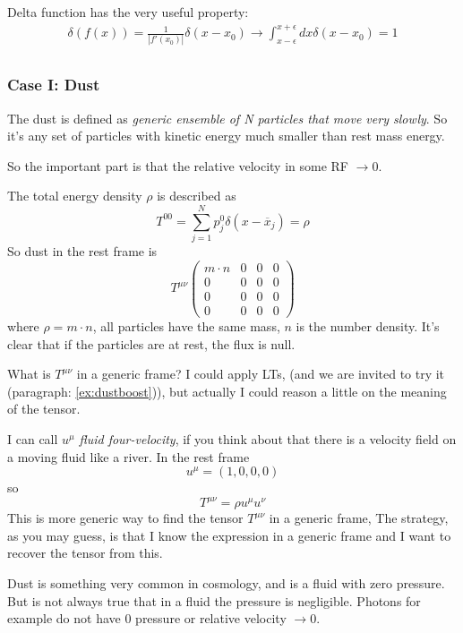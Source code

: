 Delta function has the very useful property:
\begin{gather*}
\delta\left( f\left( x \right) \right) = \frac{1}{\left| f'\left( x_{0} \right)\right|} \delta\left( x-x_{0} \right) \to \int_{x-\epsilon }^{x+\epsilon }{dx \delta \left( x-x_{0} \right)}=1\\
\end{gather*}

\subsubsection{Case I: Dust}
The dust is defined as \emph{generic ensemble of N particles that move very slowly}. So it's any set of particles with kinetic energy much smaller than rest mass energy.

So the important part is that the relative velocity in some RF $\to 0$.

The total energy density $\rho $ is described as 
\[
	T^{00} = \sum_{j = 1}^{N}{p^{0}_{j} \delta\left( x- \overline{x}_{j} \right)} = \rho 
\]
So dust in the rest frame is 
\begin{equation}
T^{\mu \nu }\begin{pmatrix}
m\cdot n & 0 & 0 & 0 \\
0 & 0 & 0 & 0 \\
0 & 0 & 0 & 0 \\
0 & 0 & 0 & 0
\end{pmatrix} 
\end{equation}
where $\rho = m\cdot n$, all particles have the same mass, $n$ is the number density. It's clear that if the particles are at rest, the flux is null.

What is $T^{\mu \nu }$ in a generic frame? I could apply LTs, (and we are invited to try it (paragraph: \ref{ex:dustboost})), but actually I could reason a little on the meaning of the tensor.

I can call $u^{\mu }$ \emph{fluid four-velocity}, if you think about that there is a velocity field on a moving fluid like a river. In the rest frame
\[
u^{\mu }= \left( 1,0,0,0 \right)
\]
so 
\[
T^{\mu \nu } = \rho u^{\mu }u^{\nu }
\]
This is more generic way to find the tensor $T^{\mu \nu }$ in a generic frame, The strategy, as you may guess, is that I know the expression in a generic frame and I want to recover the tensor from this.

Dust is something very common in cosmology, and is a fluid with zero pressure. But is not always true that in a fluid the pressure is negligible. Photons for example do not have 0 pressure or relative velocity $\to 0$.

